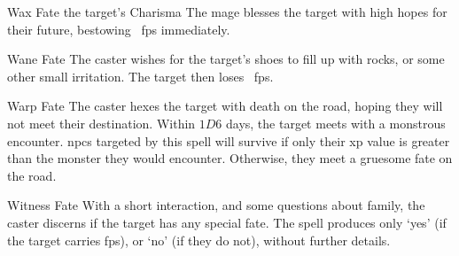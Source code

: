   {}%
  {Wax}%
  {Fate}%
  {the target's Charisma}%
  {The mage blesses the target with high hopes for their future, bestowing ~\glspl{fp} immediately.
  }%
  {}

  {}%
  {Wane}%
  {Fate}%
  {}%
  {The caster wishes for the target's shoes to fill up with rocks, or some other small irritation.
    The target then loses \showDam~\glspl{fp}.
  }%
  {}


  {}%
  {Warp}%
  {Fate}%
  {}%
  {The caster hexes the target with death on the road, hoping they will not meet their destination.
    Within $1D6$ days, the target meets with a monstrous encounter.
  }%
  {
    \Glspl{npc} targeted by this spell will survive if only their \gls{xp} value is greater than the monster they would encounter.
    Otherwise, they meet a gruesome fate on the road.
  }

  {}%
  {Witness}%
  {Fate}%
  {}%
  {With a short interaction, and some questions about family, the caster discerns if the target has any special fate.}%
  {The spell produces only `yes' (if the target carries \glspl{fp}), or `no' (if they do not), without further details.}

